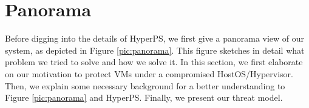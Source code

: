 \section{Panorama} \label{sec:panorama}

Before digging into the details of HyperPS, we first give a panorama view of our system, as depicted in Figure \ref{pic:panorama}. This figure sketches in detail what problem we tried to solve and how we solve it.
In this section, we first elaborate on our motivation to protect VMs under a compromised HostOS/Hypervisor. Then, we explain some necessary background for a better understanding to Figure \ref{pic:panorama} and HyperPS. Finally, we present our threat model.

